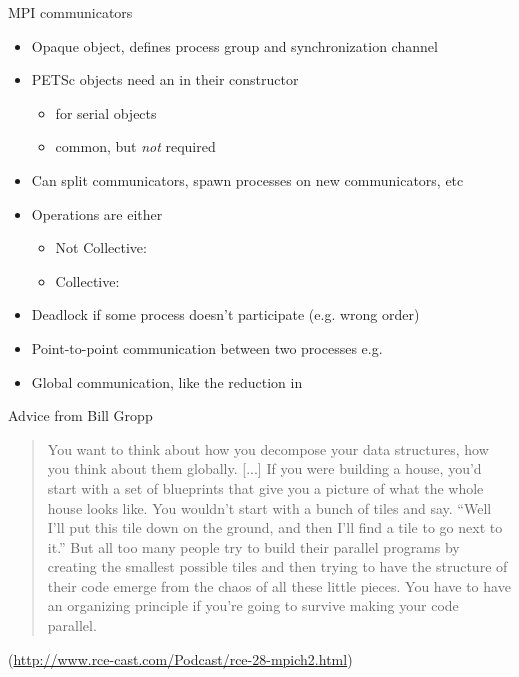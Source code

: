 \begin{frame}{MPI communicators}
  \begin{itemize}
  \item Opaque object, defines process group and synchronization channel
  \item PETSc objects need an  in their constructor
    \begin{itemize}
    \item {} for serial objects
    \item {} common, but \emph{not} required
    \end{itemize}
  \item Can split communicators, spawn processes on new communicators, etc
  \item Operations are either
    \begin{itemize}
    \item Not Collective: 
    \item Collective: 
    \end{itemize}
  \item Deadlock if some process doesn't participate (e.g. wrong order)
  \item Point-to-point communication between two processes e.g. 
  \item Global communication, like the reduction in 
  \end{itemize}
\end{frame}

\begin{frame}{Advice from Bill Gropp}
  \begin{quote}\large
    You want to think about how you decompose your data structures, how
    you think about them globally.  [...]  If you were building a house,
    you'd start with a set of blueprints that give you a picture of what
    the whole house looks like.  You wouldn't start with a bunch of
    tiles and say. ``Well I'll put this tile down on the ground, and
    then I'll find a tile to go next to it.''  But all too many people
    try to build their parallel programs by creating the smallest
    possible tiles and then trying to have the structure of their code
    emerge from the chaos of all these little pieces.  You have to have
    an organizing principle if you're going to survive making your code
    parallel.
  \end{quote}
  {\small \centering (\url{http://www.rce-cast.com/Podcast/rce-28-mpich2.html})}
\end{frame}
